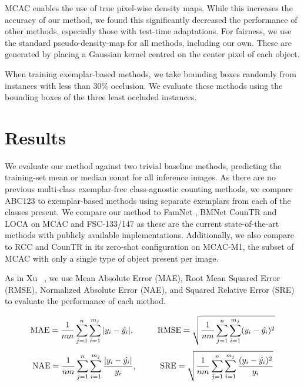 \documentclass[runningheads]{llncs}
\begin{document}
MCAC enables the use of true pixel-wise density maps. 
While this increases the accuracy of our method, we found this significantly decreased the performance of other methods, especially those with test-time adaptations.
For fairness, we use the standard \cite{ranjan2021Famnet, liu2022countr, yang2021cfoc, lin2021object} pseudo-density-map for all methods, including our own. These are generated by placing a Gaussian kernel centred on the center pixel of each object.

When training exemplar-based methods, we take bounding boxes randomly from instances with less than 30\% occlusion.
We evaluate these methods using the bounding boxes of the three least occluded instances.


\section{Results}\label{sec:results}
We evaluate our method against two trivial baseline methods, predicting the training-set mean or median count for all inference images. As there are no previous multi-class exemplar-free class-agnostic counting methods, we compare ABC123 to exemplar-based methods using separate exemplars from each of the classes present.
We compare our method to FamNet \cite{ranjan2021Famnet}, BMNet \cite{shi2022represent} CounTR \cite{liu2022countr} and LOCA \cite{Djukic2023LOCA} on MCAC and FSC-133/147 as these are the current state-of-the-art methods with publicly available implementations.
Additionally, we also compare to RCC \cite{hobley2023LTCA} and CounTR in its zero-shot configuration on MCAC-M1, the subset of MCAC with only a single type of object present per image.

As in Xu \etal~\cite{xu2023zero}, we use Mean Absolute Error (MAE), Root Mean Squared Error (RMSE), Normalized Absolute Error (NAE), and Squared Relative Error (SRE) to evaluate the performance of each method.

{\small
\begin{equation}
    \text{MAE} = \frac{1}{nm} \sum_{j=1}^n\sum_{i=1}^{m_{j}} |y_i-\hat{y_i}|, \hspace{10mm} \text{RMSE} = \sqrt{\frac{1}{nm} \sum_{j=1}^n\sum_{i=1}^{m_{j}} (y_i-\hat{y_i})^2} 
\end{equation}
\begin{equation}
\text{NAE} = \frac{1}{nm} \sum_{j=1}^n\sum_{i=1}^{m_{j}} \frac{|y_i-\hat{y_i}|}{y_i}, \hspace{10mm} \text{SRE} = \sqrt{\frac{1}{nm} \sum_{j=1}^n\sum_{i=1}^{m_{j}} \frac{(y_i-\hat{y_i})^2}{y_i}}
\end{equation}
}
\end{document}
